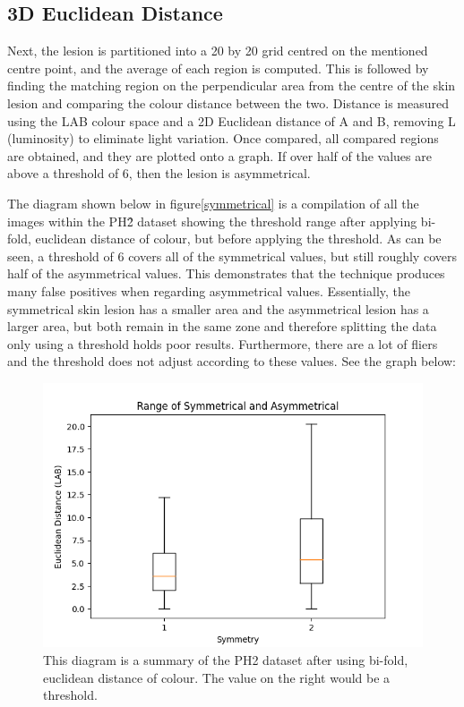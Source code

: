 
\subsection{3D Euclidean Distance}
Next, the lesion is partitioned into a 20 by 20 grid centred on the mentioned centre point, and the average of each region is computed. This is followed by finding the matching region on the perpendicular area from the centre of the skin lesion and comparing the colour distance between the two. Distance is measured using the LAB colour space and a 2D Euclidean distance of A and B, removing L (luminosity) to eliminate light variation. Once compared, all compared regions are obtained, and they are plotted onto a graph. If over half of the values are above a threshold of 6, then the lesion is asymmetrical.

The diagram shown below in figure\ref{symmetrical} is a compilation of all the images within the PH\^2 dataset showing the threshold range after applying bi-fold, euclidean distance of colour, but before applying the threshold. As can be seen, a threshold of 6 covers all of the symmetrical values, but still roughly covers half of the asymmetrical values. This demonstrates that the technique produces many false positives when regarding asymmetrical values.
Essentially, the symmetrical skin lesion has a smaller area and the asymmetrical lesion has a larger area, but both remain in the same zone and therefore splitting the data only using a threshold holds poor results. Furthermore, there are a lot of fliers and the threshold does not adjust according to these values. See the graph below:

\begin{figure} 
    \centering
    \includegraphics[scale=0.6]{images/symmetrical.png}
\caption{This diagram is a summary of the PH2 dataset after using bi-fold, euclidean distance of colour. The value on the right would be a threshold.}
\end{figure}\label{symmetrical}
    
